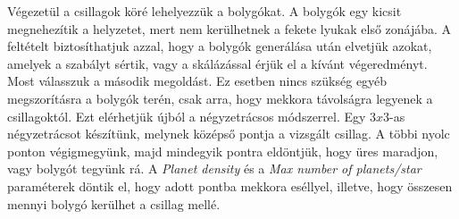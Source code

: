 Végezetül a csillagok köré lehelyezzük a bolygókat. A bolygók egy kicsit megnehezítik a helyzetet, mert nem kerülhetnek a fekete lyukak első zonájába. A feltételt biztosíthatjuk azzal, hogy a bolygók generálása után elvetjük azokat, amelyek a szabályt sértik, vagy a skálázással érjük el a kívánt végeredményt. Most válasszuk a második megoldást. Ez esetben nincs szükség egyéb megszorításra a bolygók terén, csak arra, hogy mekkora távolságra legyenek a csillagoktól. Ezt elérhetjük újból a négyzetrácsos módszerrel. Egy $3x3$-as négyzetrácsot készítünk, melynek középső pontja a vizsgált csillag. A többi nyolc ponton végigmegyünk, majd mindegyik pontra eldöntjük, hogy üres maradjon, vagy bolygót tegyünk rá. A \textit{Planet density} és a \textit{Max number of planets/star} paraméterek döntik el, hogy adott pontba mekkora eséllyel, illetve, hogy összesen mennyi bolygó kerülhet a csillag mellé.